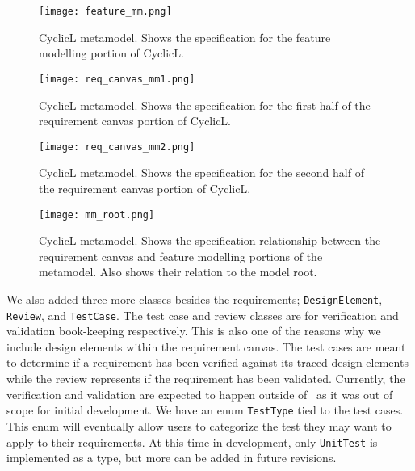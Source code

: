 %
\begin{figure}
	\centering
	\texttt{[image: feature\_mm.png]}
	\caption{CyclicL metamodel. Shows the specification for the feature modelling portion of CyclicL.}
	\label{fig:feature_mm}
\end{figure}
\begin{figure}
	\centering
	\texttt{[image: req\_canvas\_mm1.png]}
	\caption{CyclicL metamodel. Shows the specification for the first half of the requirement canvas portion of CyclicL.}
	\label{fig:req_canvas_mm1}
\end{figure}
\begin{figure}
	\centering
	\texttt{[image: req\_canvas\_mm2.png]}
	\caption{CyclicL metamodel. Shows the specification for the second half of the requirement canvas portion of CyclicL.}
	\label{fig:req_canvas_mm2}
\end{figure}
\begin{figure}
\centering
\texttt{[image: mm\_root.png]}
\caption{CyclicL metamodel. Shows the specification relationship between the requirement canvas and feature modelling portions of the metamodel. Also shows their relation to the model root.}
\label{fig:mm_root}
\end{figure}

We also added three more classes besides the requirements; \texttt{DesignElement}, \texttt{Review}, and \texttt{TestCase}. The test case and review classes are for verification and validation book-keeping respectively. This is also one of the reasons why we include design elements within the requirement canvas. The test cases are meant to determine if a requirement has been verified against its traced design elements while the review represents if the requirement has been validated. Currently, the verification and validation are expected to happen outside of \tool\ as it was out of scope for initial development. We have an enum \texttt{TestType} tied to the test cases. This enum will eventually allow users to categorize the test they may want to apply to their requirements. At this time in development, only \texttt{UnitTest} is implemented as a type, but more can be added in future revisions.

